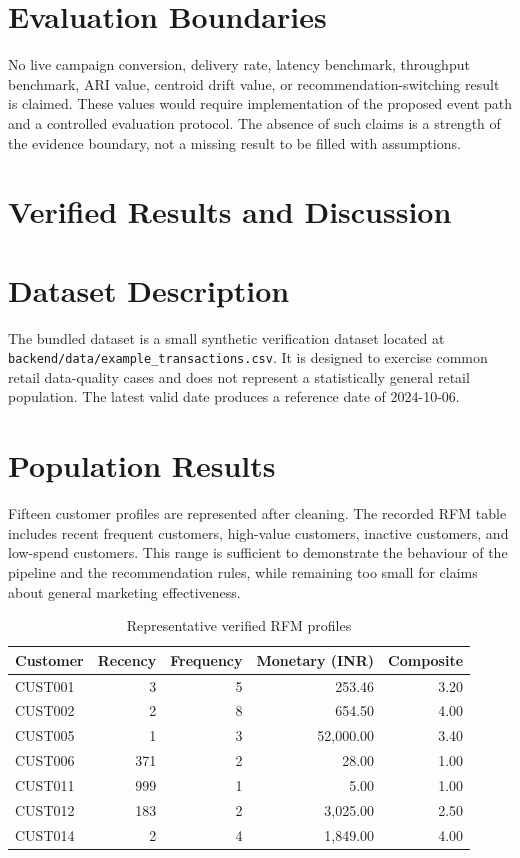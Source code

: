 \documentclass[12pt,a4paper]{report}
\begin{document}
\section{Evaluation Boundaries}
No live campaign conversion, delivery rate, latency benchmark, throughput benchmark, ARI value, centroid drift value, or recommendation-switching result is claimed. These values would require implementation of the proposed event path and a controlled evaluation protocol. The absence of such claims is a strength of the evidence boundary, not a missing result to be filled with assumptions.

\section{Verified Results and Discussion}
\section{Dataset Description}
The bundled dataset is a small synthetic verification dataset located at \texttt{backend/data/example\_transactions.csv}. It is designed to exercise common retail data-quality cases and does not represent a statistically general retail population. The latest valid date produces a reference date of 2024-10-06.

\section{Population Results}
Fifteen customer profiles are represented after cleaning. The recorded RFM table includes recent frequent customers, high-value customers, inactive customers, and low-spend customers. This range is sufficient to demonstrate the behaviour of the pipeline and the recommendation rules, while remaining too small for claims about general marketing effectiveness.

\begin{table}[H]
\centering
\caption{Representative verified RFM profiles}\label{tab:rfm-sample}
\begin{tabular}{l r r r r}
\toprule
Customer & Recency & Frequency & Monetary (INR) & Composite\\\midrule
CUST001 & 3 & 5 & 253.46 & 3.20\\
CUST002 & 2 & 8 & 654.50 & 4.00\\
CUST005 & 1 & 3 & 52,000.00 & 3.40\\
CUST006 & 371 & 2 & 28.00 & 1.00\\
CUST011 & 999 & 1 & 5.00 & 1.00\\
CUST012 & 183 & 2 & 3,025.00 & 2.50\\
CUST014 & 2 & 4 & 1,849.00 & 4.00\\\bottomrule
\end{tabular}
\end{table}
\end{document}
